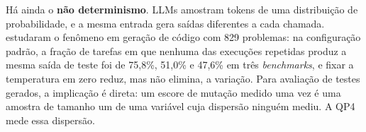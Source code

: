 Há ainda o \textbf{não determinismo}. LLMs amostram tokens de uma distribuição de probabilidade, e a mesma entrada gera saídas diferentes a cada chamada.  estudaram o fenômeno em geração de código com 829 problemas: na configuração padrão, a fração de tarefas em que nenhuma das execuções repetidas produz a mesma saída de teste foi de 75,8\%, 51,0\% e 47,6\% em três \textit{benchmarks}, e fixar a temperatura em zero reduz, mas não elimina, a variação. Para avaliação de testes gerados, a implicação é direta: um escore de mutação medido uma vez é uma amostra de tamanho um de uma variável cuja dispersão ninguém mediu. A QP4 mede essa dispersão.

